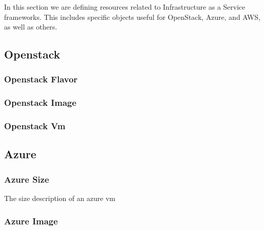 \documentclass[9pt,twocolumn,twoside]{styles/osajnl}
\begin{document}
In this section we are defining resources related to Infrastructure as
a Service frameworks. This includes specific objects useful for
OpenStack, Azure, and AWS, as well as others.

\subsection{Openstack}

\subsubsection{Openstack Flavor}


\subsubsection{Openstack Image}


\subsubsection{Openstack Vm}


\subsection{Azure}

\subsubsection{Azure Size}

The size description of an azure vm



\subsubsection{Azure Image}
\end{document}
